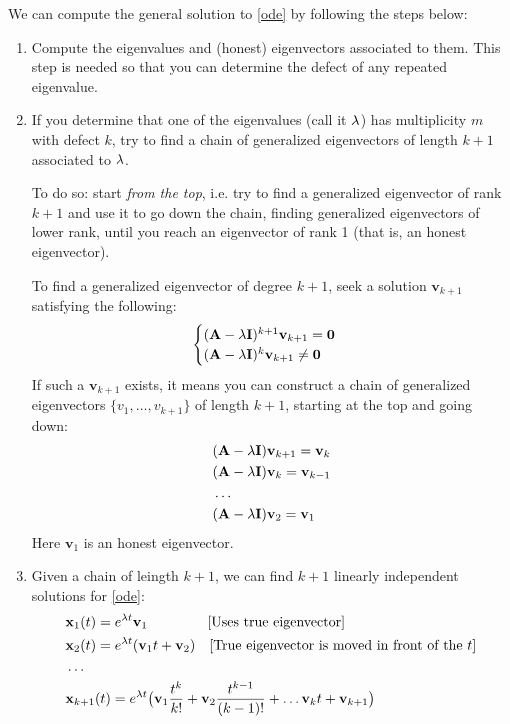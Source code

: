 \documentclass[12pt]{article}
\newcommand{\bx}{\mathbf{x}}
\newcommand{\bv}{\mathbf{v}}
\newcommand{\bA}{\mathbf{A}}
\newcommand{\bI}{\mathbf{I}}
\newcommand{\NI}{\noindent}
\begin{document}
\NI We can compute the general solution to \eqref{ode} by following the steps below:
\begin{enumerate}
	\item Compute the eigenvalues and (honest) eigenvectors associated to them. This step is needed so that you can determine the defect of any repeated eigenvalue.
	\item \label{step2} If you determine that one of the eigenvalues (call it $\lambda$) has multiplicity $m$ with defect $k$, try to find a chain of generalized eigenvectors of length $k+1$ associated to $\lambda$.

	To do so: start \emph{from the top}, i.e. try to find a generalized eigenvector of rank $k+1$ and use it to go down the chain, finding generalized eigenvectors of lower rank, until you reach an eigenvector of rank 1 (that is, an honest eigenvector).

	To find a generalized eigenvector of degree $k+1$, seek a solution $\bv_{k+1}$ satisfying the following:
	\begin{equation}\label{eq:gen_eigen}
		\begin{cases}
			(\bA-\l \bI)^{k+1}\bv_{k+1}=\mathbf{0}\\
			(\bA-\l \bI)^{k}\bv_{k+1}\neq \mathbf{0}
		\end{cases}
	\end{equation}
	If such a $\bv_{k+1}$ exists, it means you can construct a chain of generalized eigenvectors $\{v_1,\dots,v_{k+1}\}$ of length $k+1$, starting at the top and going down:
	\begin{equation}
		\label{eq:chain}
	\begin{aligned}
		&(\bA-\l \bI)\bv_{k+1}=\bv_k\\
		&(\bA-\l \bI)\bv_{k}=\bv_{k-1}\\
		&\dots\\
		&(\bA-\l \bI)\bv_{2}=\bv_{1}
	\end{aligned}
\end{equation}
Here $\bv_1$ is an honest eigenvector.

	
	\item Given a chain of leingth $k+1$, we can find $k+1$ linearly independent solutions for \eqref{ode}:
	\begin{align}
		&\bx_1(t)=e^{\l t}\bv_1\qquad \qquad \;\text{[Uses true eigenvector]}\\
		&\bx_2(t)=e^{\l t}(\bv_1 t+\bv_2)\quad \text{[True eigenvector is moved in front of the $t$]}\\
		&\dots\\
		&\bx_{k+1}(t)=e^{\l t}\big(\bv_1 \frac{t^k}{k!}+\bv_2\frac{t^{k-1}}{(k-1)!}+\dots \bv_{k}t+\bv_{k+1}\big)
	\end{align}
		

\end{enumerate}
\end{document}
